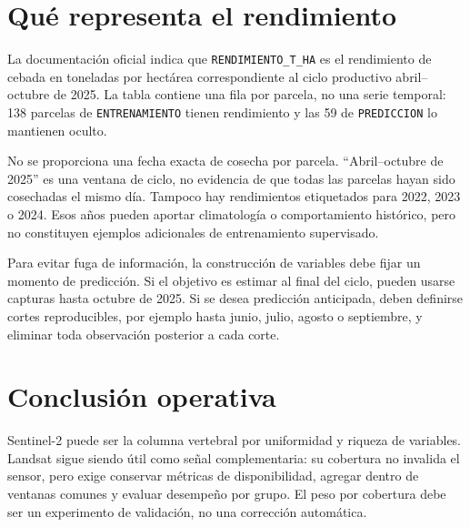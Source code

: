 \documentclass[11pt,a4paper]{article}
\begin{document}
\section{Qué representa el rendimiento}
La documentación oficial indica que \texttt{RENDIMIENTO\_T\_HA} es el rendimiento
de cebada en toneladas por hectárea correspondiente al ciclo productivo
abril--octubre de 2025. La tabla contiene una fila por parcela, no una serie
temporal: 138 parcelas de \texttt{ENTRENAMIENTO} tienen rendimiento y las 59 de
\texttt{PREDICCION} lo mantienen oculto.

No se proporciona una fecha exacta de cosecha por parcela. ``Abril--octubre de
2025'' es una ventana de ciclo, no evidencia de que todas las parcelas hayan sido
cosechadas el mismo día. Tampoco hay rendimientos etiquetados para 2022, 2023 o
2024. Esos años pueden aportar climatología o comportamiento histórico, pero no
constituyen ejemplos adicionales de entrenamiento supervisado.

Para evitar fuga de información, la construcción de variables debe fijar un
momento de predicción. Si el objetivo es estimar al final del ciclo, pueden usarse
capturas hasta octubre de 2025. Si se desea predicción anticipada, deben definirse
cortes reproducibles, por ejemplo hasta junio, julio, agosto o septiembre, y
eliminar toda observación posterior a cada corte.

\section{Conclusión operativa}
Sentinel-2 puede ser la columna vertebral por uniformidad y riqueza de variables.
Landsat sigue siendo útil como señal complementaria: su cobertura no invalida el
sensor, pero exige conservar métricas de disponibilidad, agregar dentro de
ventanas comunes y evaluar desempeño por grupo. El peso por cobertura debe ser
un experimento de validación, no una corrección automática.
\end{document}

